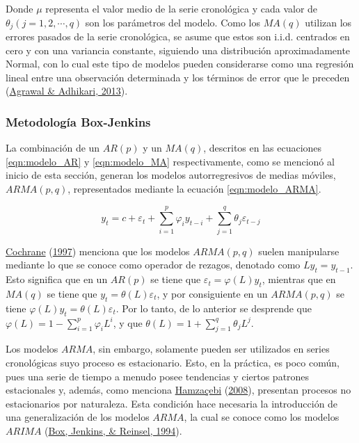 \documentclass[
]{article}
\begin{document}
Donde \(\mu\) representa el valor medio de la serie cronológica y cada
valor de \(\theta_j(j=1,2,\cdots,q)\) son los parámetros del modelo.
Como los \(MA(q)\) utilizan los errores pasados de la serie cronológica,
se asume que estos son i.i.d. centrados en cero y con una variancia
constante, siguiendo una distribución aproximadamente Normal, con lo
cual este tipo de modelos pueden considerarse como una regresión lineal
entre una observación determinada y los términos de error que le
preceden (\protect\hyperlink{ref-stationary_def}{Agrawal \& Adhikari,
2013}).

\subsubsection{Metodología Box-Jenkins}

La combinación de un \(AR(p)\) y un \(MA(q)\), descritos en las
ecuaciones \ref{eqn:modelo_AR} y \ref{eqn:modelo_MA} respectivamente,
como se mencionó al inicio de esta sección, generan los modelos
autorregresivos de medias móviles, \(ARMA(p,q)\), representados mediante
la ecuación \ref{eqn:modelo_ARMA}.

\begin{equation}
\label{eqn:modelo_ARMA}
y_t=c+\varepsilon_t+\sum_{i=1}^p \varphi_iy_{t-i}+\sum_{j=1}^q \theta_j \varepsilon_{t-j}
\end{equation}

\protect\hyperlink{ref-Cochrane}{Cochrane}
(\protect\hyperlink{ref-Cochrane}{1997}) menciona que los modelos
\(ARMA(p,q)\) suelen manipularse mediante lo que se conoce como operador
de rezagos, denotado como \(Ly_t=y_{t-1}\). Esto significa que en un
\(AR(p)\) se tiene que \(\varepsilon_t=\varphi(L)y_t\), mientras que en
\(MA(q)\) se tiene que \(y_t=\theta(L)\varepsilon_t\), y por
consiguiente en un \(ARMA(p,q)\) se tiene
\(\varphi(L)y_t=\theta(L)\varepsilon_t\). Por lo tanto, de lo anterior
se desprende que \(\varphi(L)=1-\sum_{i=1}^p \varphi_iL^i\), y que
\(\theta(L)=1+\sum_{j=1}^q\theta_jL^j\).

Los modelos \(ARMA\), sin embargo, solamente pueden ser utilizados en
series cronológicas suyo proceso es estacionario. Esto, en la práctica,
es poco común, pues una serie de tiempo a menudo posee tendencias y
ciertos patrones estacionales y, además, como menciona
\protect\hyperlink{ref-Hamzacebi}{Hamzaçebi}
(\protect\hyperlink{ref-Hamzacebi}{2008}), presentan procesos no
estacionarios por naturaleza. Esta condición hace necesaria la
introducción de una generalización de los modelos \(ARMA\), la cual se
conoce como los modelos \(ARIMA\)
(\protect\hyperlink{ref-box-jenkins}{Box, Jenkins, \& Reinsel, 1994}).
\end{document}
